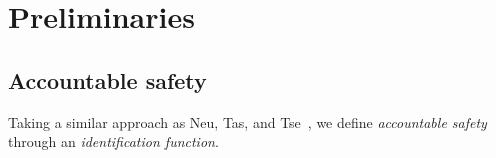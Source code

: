 \section{Preliminaries}


%
%



\subsection{Accountable safety}\label{sec:accountable-safety}
Taking a similar approach as Neu, Tas, and Tse~\cite[Def. 4]{FC:NeuTasTse22}, we define \emph{accountable safety} through an \emph{identification function}.


